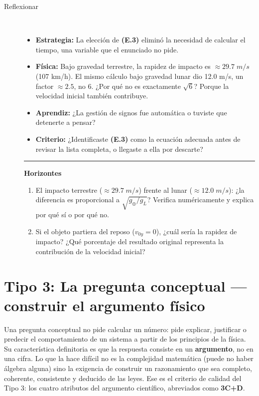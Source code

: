 \documentclass[11pt]{book}
\begin{document}
\begin{enumerate}
\begin{description}
\item[Reflexionar]~
\begin{itemize}
    \item \textbf{Estrategia:} La elección de \textbf{(E.3)} eliminó la necesidad de calcular el tiempo, una variable que el enunciado no pide.
    \item \textbf{Física:} Bajo gravedad terrestre, la rapidez de impacto es $\approx 29.7\;m/s$ (107 km/h). El mismo cálculo bajo gravedad lunar dio 12.0 m/s, un factor $\approx 2.5$, no 6. ¿Por qué no es exactamente $\sqrt{6}$? Porque la velocidad inicial también contribuye.
    \item \textbf{Aprendiz:} ¿La gestión de signos fue automática o tuviste que detenerte a pensar?
    \item \textbf{Criterio:} ¿Identificaste \textbf{(E.3)} como la ecuación adecuada antes de revisar la lista completa, o llegaste a ella por descarte?
\end{itemize}

\medskip
\noindent\rule{\linewidth}{0.4pt}
\noindent\textbf{Horizontes}
\medskip

\begin{enumerate}
    \item El impacto terrestre ($\approx 29.7\;m/s$) frente al lunar ($\approx 12.0\;m/s$): ¿la diferencia es proporcional a $\sqrt{g_\oplus / g_L}$? Verifica numéricamente y explica por qué sí o por qué no.
    \item Si el objeto partiera del reposo ($v_{0y} = 0$), ¿cuál sería la rapidez de impacto? ¿Qué porcentaje del resultado original representa la contribución de la velocidad inicial?
\end{enumerate}
\end{description}
\end{enumerate}

\section{Tipo 3: La pregunta conceptual --- construir el argumento físico}

Una pregunta conceptual no pide calcular un número: pide explicar, justificar o predecir el comportamiento de un sistema a partir de los principios de la física. Su característica definitoria es que la respuesta consiste en un {\bf argumento}, no en una cifra. Lo que la hace difícil no es la complejidad matemática (puede no haber álgebra alguna) sino la exigencia de construir un razonamiento que sea completo, coherente, consistente y deducido de las leyes. Ese es el criterio de calidad del Tipo 3: los cuatro atributos del argumento científico, abreviados como {\bf 3C+D}.
\end{document}
